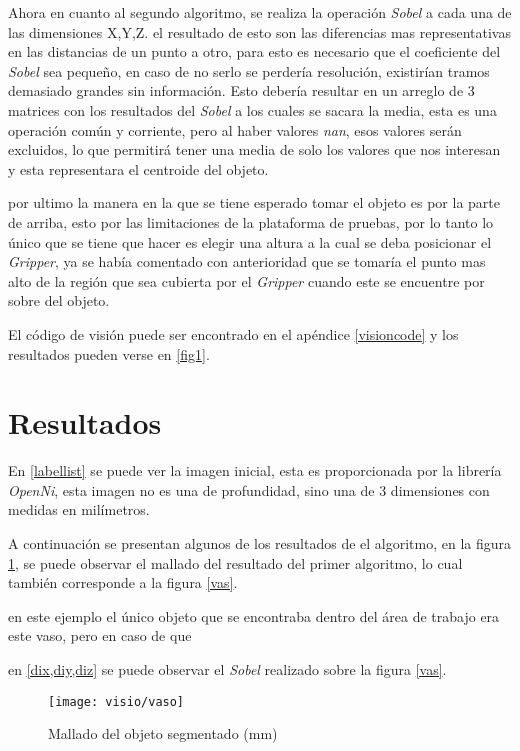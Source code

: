     Ahora en cuanto al segundo algoritmo, se realiza la operación \textit{Sobel} a cada una de las dimensiones X,Y,Z. el resultado de esto son las diferencias mas representativas en las distancias de un punto a otro, para esto es necesario que el coeficiente del \textit{Sobel} sea pequeño, en caso de no serlo se perdería resolución, existirían tramos demasiado grandes sin información. Esto debería resultar en un arreglo de 3 matrices con los resultados del \textit{Sobel} a los cuales se sacara la media, esta es una operación común y corriente, pero al haber valores \textit{nan}, esos valores serán excluidos, lo que permitirá tener una media de solo los valores que nos interesan y esta representara el centroide del objeto.
    
    por ultimo la manera en la que se tiene esperado tomar el objeto es por la parte de arriba, esto por las limitaciones de la plataforma de pruebas, por lo tanto lo único que se tiene que hacer es elegir una altura a la cual se deba posicionar el \textit{Gripper}, ya se había comentado con anterioridad que se tomaría el punto mas alto de la región que sea cubierta por el \textit{Gripper} cuando este se encuentre por sobre del objeto. 
    
    El código de visión puede ser encontrado en el apéndice \ref{visioncode} y los resultados pueden verse en \cref{fig1}.
    
    \section{Resultados}
    
    En \cref{labellist} se puede ver la imagen inicial, esta es proporcionada por la librería \textit{OpenNi}, esta imagen no es una de profundidad, sino una de 3 dimensiones con medidas en milímetros.
    
    
    A continuación se presentan algunos de los resultados de el algoritmo, en la figura  \ref{vaso}, se puede observar el mallado del resultado del primer algoritmo, lo cual también corresponde a la figura {\tiny }\ref{vas}.
    
    en este ejemplo el único objeto que se encontraba dentro del área de trabajo era este vaso, pero en caso de que
    
    
    
    en \ref{dix,diy,diz} se puede observar el \textit{Sobel} realizado sobre la figura \ref{vas}.
    
    \begin{figure}[h]
    	\centering
    	\texttt{[image: visio/vaso]}
    	\caption{Mallado del objeto segmentado (mm)}
    	\label{vaso}
    \end{figure}

